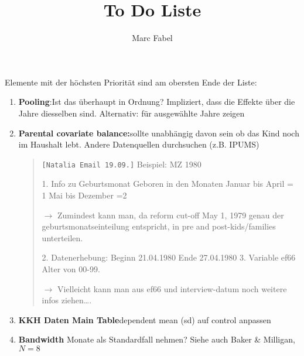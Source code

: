 \documentclass[11pt,a4paper]{article}
\author{Marc Fabel}
\title{To Do Liste}
\date{\flushleft{Last revision of the document: \today}}
\begin{document}
\maketitle




Elemente mit der höchsten Priorität sind am obersten Ende der Liste:
\begin{enumerate}
\item \textbf{Pooling}:\newline Ist das  überhaupt in Ordnung? Impliziert, dass die Effekte über die Jahre diesselben sind. Alternativ: für ausgewählte	Jahre zeigen

\item \textbf{Parental covariate balance:}\newline sollte unabhängig davon sein ob das Kind noch im Haushalt lebt. Andere Datenquellen durchsuchen (z.B. IPUMS)


\begin{quote}
\texttt{[Natalia Email 19.09.]}\newline
Beispiel: MZ 1980 

1.	Info zu Geburtsmonat   Geboren in den Monaten
Januar bis April = 1
Mai bis Dezember  =2 

$\rightarrow$	Zumindest kann man, da reform cut-off May 1, 1979 genau der geburtsmonatseinteilung entspricht, in pre and post-kids/families unterteilen.

2.	Datenerhebung: 
Beginn 21.04.1980 
Ende 27.04.1980 
3. Variable ef66 Alter von 00-99.

$\rightarrow$	Vielleicht kann man aus ef66 und interview-datum noch weitere infos ziehen….

\end{quote}

\item \textbf{KKH Daten Main Table}\newline dependent mean (sd) auf control anpassen

\item \textbf{Bandwidth} Monate als Standardfall nehmen? \newline
Siehe auch Baker \& Milligan, $N=8$
\end{enumerate}
\end{document}
